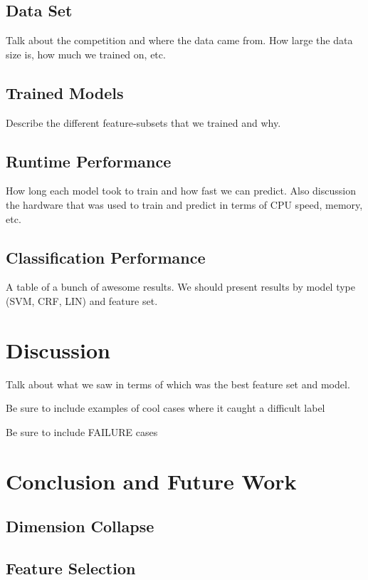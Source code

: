 \documentclass[preprint]{style}
\begin{document}
\subsection{Data Set}

Talk about the competition and where the data came from. How large the data size is, how much we trained on, etc.

\subsection{Trained Models}

Describe the different feature-subsets that we trained and why.

\subsection{Runtime Performance}

How long each model took to train and how fast we can predict. Also discussion the hardware that was used to train and predict in terms of CPU speed, memory, etc.

\subsection{Classification Performance}

A table of a bunch of awesome results. We should present results by model type (SVM, CRF, LIN) and feature set.

\section{Discussion}

Talk about what we saw in terms of which was the best feature set and model. 

Be sure to include examples of cool cases where it caught a difficult label

Be sure to include FAILURE cases

\section{Conclusion and Future Work}

\subsection{Dimension Collapse}

\subsection{Feature Selection}
\end{document}
